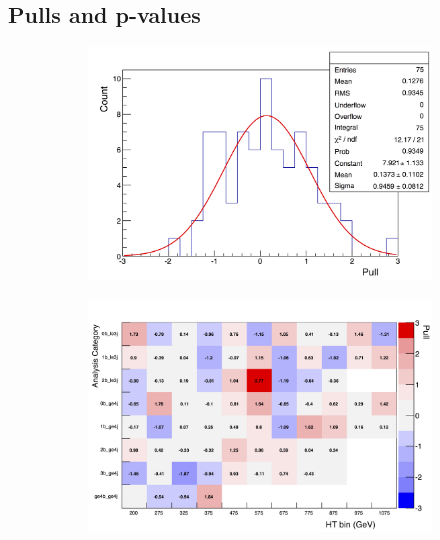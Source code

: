 \subsection{Pulls and p-values}

\begin{figure}[h!]
  \centering
  \begin{subfigure}[b]{0.46\textwidth}
    \includegraphics[width=\textwidth]{Figs/results/v0/pulls/pull_per_bin_img.png}
    \caption{}
    \label{fig:pull_distro}
  \end{subfigure}
  \begin{subfigure}[b]{0.46\textwidth}
    \includegraphics[width=\textwidth]{Figs/results/v0/pulls/chris_latest2_2_img.png}
    \caption{}
    \label{fig:french_flag}
  \end{subfigure}\\
  \begin{subfigure}[b]{0.46\textwidth}

\end{subfigure}
\end{figure}
